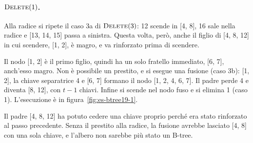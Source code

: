 \paragraph{$\textsc{Delete}(1)$.}
Alla radice si ripete il caso 3a di $\textsc{Delete}(3)$: 12 scende in [4, 8], 16 sale nella radice e [13, 14, 15] passa a sinistra. Questa volta, però, anche il figlio di [4, 8, 12] in cui scendere, [1, 2], è magro, e va rinforzato prima di scendere.

Il nodo [1, 2] è il primo figlio, quindi ha un solo fratello immediato, [6, 7], anch'esso magro. Non è possibile un prestito, e si esegue una fusione (caso 3b): [1, 2], la chiave separatrice 4 e [6, 7] formano il nodo [1, 2, 4, 6, 7]. Il padre perde 4 e diventa [8, 12], con $t-1$ chiavi. Infine si scende nel nodo fuso e si elimina 1 (caso 1). L'esecuzione è in figura~\ref{fig:es-btree19-1}.

Il padre [4, 8, 12] ha potuto cedere una chiave proprio perché era stato rinforzato al passo precedente. Senza il prestito alla radice, la fusione avrebbe lasciato [4, 8] con una sola chiave, e l'albero non sarebbe più stato un B-tree.


